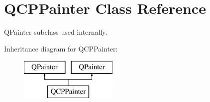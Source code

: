 \hypertarget{class_q_c_p_painter}{}\section{Q\+C\+P\+Painter Class Reference}
\label{class_q_c_p_painter}


Q\+Painter subclass used internally.  


Inheritance diagram for Q\+C\+P\+Painter\+:\begin{figure}[H]
\begin{center}
\leavevmode
\includegraphics[height=2.000000cm]{class_q_c_p_painter}
\end{center}
\end{figure}
